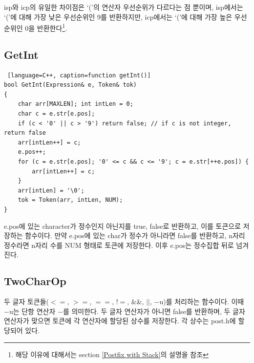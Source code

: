 \documentclass{article}
\begin{document}
isp와 icp의 유일한 차이점은 `('의 연산자 우선순위가 다르다는 점 뿐이며, isp에서는 `('에 대해 가장 낮은 우선순위인 9를 반환하지만, icp에서는 `('에 대해 가장 높은 우선순위인 0을 반환한다\footnote{해당 이유에 대해서는 section \ref{Postfix with Stack}의 설명을 참조}.
\subsection{GetInt}
\begin{lstlisting} [language=C++, caption=function getInt()]
bool GetInt(Expression& e, Token& tok)
{
	char arr[MAXLEN]; int intLen = 0;
	char c = e.str[e.pos];
	if (c < '0' || c > '9') return false; // if c is not integer, return false
	arr[intLen++] = c;
	e.pos++;
	for (c = e.str[e.pos]; '0' <= c && c <= '9'; c = e.str[++e.pos]) {
		arr[intLen++] = c;
	}
	arr[intLen] = '\0';
	tok = Token(arr, intLen, NUM);
}
\end{lstlisting}
e.pos에 있는 character가 정수인지 아닌지를 true, false로 반환하고, 이를 토큰으로 저장하는 함수이다. 만약 e.pos에 있는 char가 정수가 아니라면 false를 반환하고, n자리 정수라면 n자리 수를 NUM 형태로 토큰에 저장한다. 이후 e.pos는 정수집합 뒤로 넘겨진다.
\subsection{TwoCharOp}
두 글자 토큰들($<=$, $>=$, $==$, $!=$, \&\&, $||$, $-$u)를 처리하는 함수이다. 이때 $-$u는 단항 연산자 $-$를 의미한다. 두 글자 연산자가 아니면 false를 반환하며, 두 글자 연산자가 맞으면 토큰에 각 연산자에 할당된 상수를 저장한다. 각 상수는 post.h에 할당되어 있다.
\end{document}
